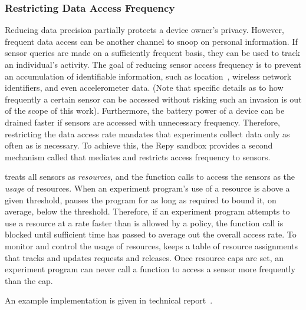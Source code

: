 \subsubsection{Restricting Data Access Frequency}\label{sec-nanny}

Reducing data precision partially protects a device owner's privacy. However, frequent data 
access can be another channel to snoop on personal information.
If sensor queries are made on a sufficiently frequent basis, they can be used
to track an individual's activity. The goal of reducing sensor access frequency 
is to prevent an accumulation of identifiable information, such as 
location~\cite{gruteser2003anonymous}, wireless network identifiers, and even 
accelerometer data. (Note that specific
details as to how frequently a certain sensor can be accessed without risking such an 
invasion is out of the scope of this work). 
Furthermore, the battery power of a device can 
be drained faster if sensors are accessed
with unnecessary frequency. Therefore, restricting the data access rate 
mandates that experiments collect data only as often as is necessary. 
To achieve this, the Repy sandbox provides a second mechanism
called  that mediates and restricts access frequency to sensors. 

 treats all sensors as \textit{resources}, and the function calls to 
access the sensors as the \textit{usage} of resources. 
When an 
experiment program's use of a resource is above a given threshold, 
 pauses the 
program for as long as required to bound it, on average, below the
threshold. Therefore, if an experiment program attempts to 
use a resource at a rate faster than is allowed by a policy, the function 
call is blocked until sufficient time has passed to average out the overall access rate. 
To monitor and control the usage of resources,  keeps a 
table of resource assignments that tracks and updates requests and releases. 
Once resource caps are set, an experiment program can never call a 
function to access a sensor more frequently than the cap. 

An example implementation is given in technical report~\cite{zhuangTR15}.

